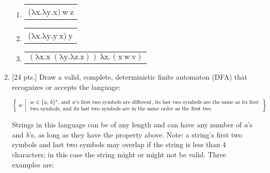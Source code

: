 \documentclass[11pt]{article}
\makeatletter
\newcommand{\quest}[3]{%
    \begin{tabular}[t]{@{}p{#1}@{\hspace{3mm}}%
                         @{\underline{\hspace{#2}}}@{}}%
                       \sloppy#3\end{tabular}%
  }
\newcommand{\sms}{\ensuremath{\hspace{.1mm}}}
\makeatother
\begin{document}
\begin{enumerate}
\begin{enumerate}
            \addtolength{\itemsep}{16mm}

            \item \quest{3.7in}{2.375in}
                        {($\mathrm{\lambda x.\lambda y.x) \ w \ z}$}

            \item \quest{3.7in}{2.375in}
                        {($\mathrm{\lambda x.\lambda y.y \ x) \ y}$}

            \item \quest{3.7in}{2.375in}
                        {$\mathrm{
                          ( \lambda x.x \ (\lambda y.\lambda z.z) ) \
                          \lambda x.( x \ w \ v )
                          }$}

          \end{enumerate}

          \pagebreak


    \item {[24 pts.]} Draw a valid, complete, deterministic finite automaton
          (DFA) that recognizes or accepts the language:

          \medskip

          \begin{centering}

            \(
              \left\{
                \
                \begin{array}[c]{@{}l@{}}
                w \:
                \end{array}
                \left| \ \
                \parbox[c]{5.8in}{
                  $w \sms \in \sms \{ \sms a, \, b \sms \}^*$,
                  and \emph{w}'s first two symbols are different, its last
                  two symbols are the same as its first two symbols, and
                  its last two symbols are in the same order as the first two
                }
              \ \:
              \right.
              \right\}
            \)

          \end{centering}

          \medskip

          Strings in this language can be of any length and can have any
          number of \emph{a}'s and \emph{b}'s, as long as they have the
          property above.  Note: a string's first two symbols and last two
          symbols may overlap if the string is less than 4 characters; in
          this case the string might or might not be valid.  Three examples
          are:


\end{enumerate}
\end{document}
